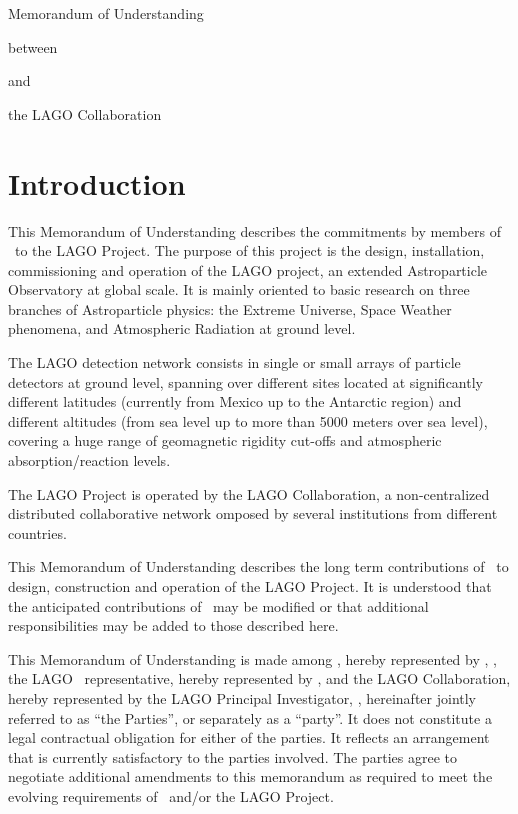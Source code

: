 {\bf
  {\LARGE
    \centerline{Memorandum of Understanding}
  }
  {\Large
    \centerline{between}
    \centerline{\institution}
    \centerline{and}
    \centerline{the LAGO Collaboration}
    \vspace*{0.2cm}
    \centerline{\datesignen}
  }
}

\section{Introduction}

This Memorandum of Understanding describes the commitments by members of
\institution~to the LAGO Project. The purpose of this project is the design,
installation, commissioning and operation of the LAGO project, an extended
Astroparticle Observatory at global scale.
It is mainly oriented to basic research on three branches of Astroparticle
physics: the Extreme Universe, Space Weather phenomena, and Atmospheric
Radiation at ground level.

The LAGO detection network consists in single or small arrays of particle
detectors at ground level, spanning over different sites located at
significantly different latitudes (currently from Mexico up to the Antarctic
region) and different altitudes (from sea level up to more than 5000 meters
over sea level), covering a huge range of geomagnetic rigidity cut-offs and
atmospheric absorption/reaction levels. 

The LAGO Project is operated by the LAGO Collaboration, a non-centralized
distributed collaborative network omposed by several institutions from
different countries.

This Memorandum of Understanding describes the long term contributions of
\institution~to design, construction and operation of the LAGO Project. It is
understood that the anticipated contributions of \institution~may be modified
or that additional responsibilities may be added to those described here. 

This Memorandum of Understanding is made among \institution, hereby
represented by 
\ifil
\instlegalrep,
\else
\instrep, 
\fi
the LAGO \country~representative, hereby represented
by \countryrep, and the LAGO Collaboration, hereby represented by the LAGO
Principal Investigator, \lagopi, hereinafter jointly referred to as ``the
Parties'', or separately as a ``party''. It does not constitute a legal
contractual obligation for either of the parties. It reflects an arrangement
that is currently satisfactory to the parties involved.  The parties agree to
negotiate additional amendments to this memorandum as required to meet the
evolving requirements of \institution~and/or the LAGO Project.

